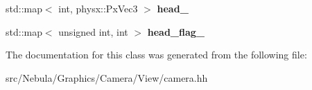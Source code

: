 \begin{DoxyCompactItemize}
\item 
\hypertarget{classneb_1_1camera_1_1camera_ad7207f50c2cfe3402fa57334f7557d03}{std\-::map$<$ int, physx\-::\-Px\-Vec3 $>$ {\bfseries head\-\_\-}}\label{classneb_1_1camera_1_1camera_ad7207f50c2cfe3402fa57334f7557d03}

\item 
\hypertarget{classneb_1_1camera_1_1camera_a011e06042be1b866b098f91ff2413921}{std\-::map$<$ unsigned int, int $>$ {\bfseries head\-\_\-flag\-\_\-}}\label{classneb_1_1camera_1_1camera_a011e06042be1b866b098f91ff2413921}

\end{DoxyCompactItemize}


The documentation for this class was generated from the following file\-:\begin{DoxyCompactItemize}
\item 
src/\-Nebula/\-Graphics/\-Camera/\-View/camera.\-hh\end{DoxyCompactItemize}
